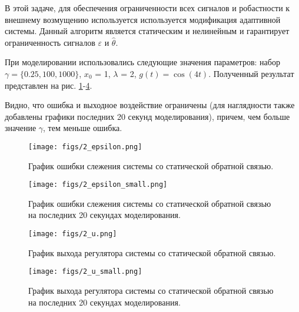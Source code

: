 \documentclass{article}
\begin{document}
В этой задаче, для обеспечения ограниченности всех сигналов и робастности к внешнему возмущению используется используется модификация адаптивной системы. Данный алгоритм является статическим и нелинейным и гарантирует ограниченность сигналов $\varepsilon$ и $\hat \theta$.

При моделировании использовались следующие значения параметров: набор $\gamma = \{0.25, 100, 1000\}$, $x_0$ = 1, $\lambda$ = 2, $g(t) = \cos(4t)$. Полученный результат представлен на рис. \ref{fig:2_epsilon}-\ref{fig:2_u_small}.

Видно, что ошибка и выходное воздействие ограничены (для наглядности также добавлены графики последних 20 секунд моделирования), причем, чем больше значение $\gamma$, тем меньше ошибка.


\begin{figure}[h!]
  \centering
  \texttt{[image: figs/2\_epsilon.png]}
  \caption{График ошибки слежения системы со статической обратной связью.} 
  \label{fig:2_epsilon}
\end{figure}

\begin{figure}[h!]
  \centering
  \texttt{[image: figs/2\_epsilon\_small.png]}
  \caption{График ошибки слежения системы со статической обратной связью на последних 20 секундах моделирования.} 
  \label{fig:2_epsilon_small}
\end{figure}

\begin{figure}[h!]
  \centering
  \texttt{[image: figs/2\_u.png]}
  \caption{График выхода регулятора системы со статической обратной связью.} 
  \label{fig:2_u}
\end{figure}

\begin{figure}[h!]
  \centering
  \texttt{[image: figs/2\_u\_small.png]}
  \caption{График выхода регулятора системы со статической обратной связью на последних 20 секундах моделирования.} 
  \label{fig:2_u_small}
\end{figure}
\end{document}
